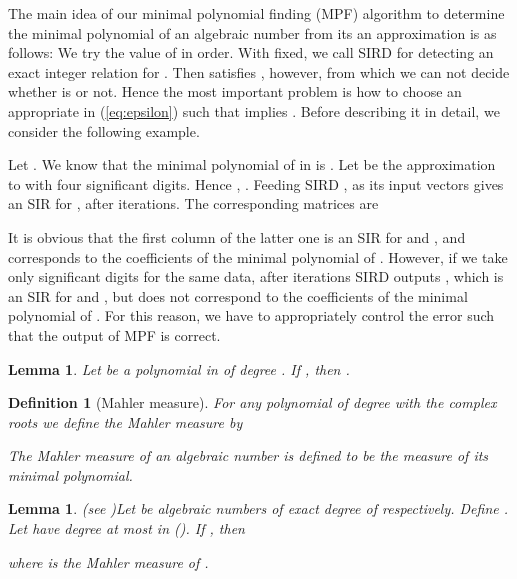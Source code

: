\documentclass{sig-alternate}
\newtheorem{lem}[theorem]{Lemma}
\newtheorem{defn}[theorem]{Definition}
\numberwithin{theorem}{section} \numberwithin{equation}{section}
\begin{document}
 The main idea of our minimal
polynomial finding (MPF) algorithm to determine the minimal
polynomial of an algebraic number from its an approximation is as
follows: We try the value of   in order. With 
fixed, we call SIRD for detecting an exact integer relation
 for . Then
 satisfies ,
however, from which we can not decide whether  is 
or not. Hence the most important problem is how to choose an
appropriate  in (\ref{eq:epsilon}) such that
 implies .
Before describing it
in detail, we consider the following example.

\begin{exmp}\label{exmp:x^2-4x+7}
Let . We know that the minimal polynomial of
 in  is . Let  be the approximation to  with four significant
digits. Hence , . Feeding SIRD ,  as its
input vectors gives an SIR for ,  after
 iterations. The corresponding matrices  are

It is obvious that the first column of the latter one
is an SIR for  and , and corresponds to
the coefficients of the minimal polynomial of . However, if
we take only  significant digits for the same data, after 
iterations SIRD outputs , which is an SIR for
 and , but does not correspond
to the coefficients of the minimal polynomial of . For this
reason, we have to appropriately control the error such that the
output of MPF is correct.
\end{exmp}








\begin{lem}\label{lem:approximation-of-f}
Let  be a polynomial in  of degree . If
, then
.
\end{lem}

\begin{defn}[Mahler measure]
For any polynomial  of
degree  with the complex roots  we
define the Mahler measure  by

The Mahler measure of an algebraic number  is defined to be
the measure of its minimal polynomial.
\end{defn}

\begin{lem}(see \cite[Lemma 3]{MW1978})\label{lem:Mignotte}
Let  be algebraic numbers of exact
degree of  respectively. Define
. Let  have degree at most  in
 (). If , then

where  is the Mahler measure of .
\end{lem}
\end{document}

